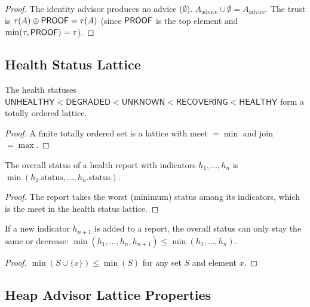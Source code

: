 \documentclass[11pt]{article}
\begin{document}
\begin{proof}
The identity advisor produces no advice ($\emptyset$).
$A_{\text{advice}} \cup \emptyset = A_{\text{advice}}$.
The trust is $\tau(A) \oplus \mathsf{PROOF} = \tau(A)$ (since $\mathsf{PROOF}$
is the top element and $\min(\tau, \mathsf{PROOF}) = \tau$).
\end{proof}

\subsection{Health Status Lattice}
\label{app:health-lattice}

\begin{lemma}
\label{lem:health-lattice}
The health statuses
$\mathsf{UNHEALTHY} < \mathsf{DEGRADED} < \mathsf{UNKNOWN}
< \mathsf{RECOVERING} < \mathsf{HEALTHY}$
form a totally ordered lattice.
\end{lemma}

\begin{proof}
A finite totally ordered set is a lattice with meet $= \min$
and join $= \max$.
\end{proof}

\begin{lemma}
\label{lem:health-meet}
The overall status of a health report with indicators
$h_1, \ldots, h_n$ is $\min(h_1.\mathrm{status}, \ldots, h_n.\mathrm{status})$.
\end{lemma}

\begin{proof}
The report takes the worst (minimum) status among its indicators,
which is the meet in the health status lattice.
\end{proof}

\begin{lemma}
\label{lem:health-degrade}
If a new indicator $h_{n+1}$ is added to a report, the overall
status can only stay the same or decrease:
$\min(h_1, \ldots, h_n, h_{n+1}) \leq \min(h_1, \ldots, h_n)$.
\end{lemma}

\begin{proof}
$\min(S \cup \{x\}) \leq \min(S)$ for any set $S$ and element $x$.
\end{proof}

\subsection{Heap Advisor Lattice Properties}
\label{app:heap-lattice}
\end{document}
